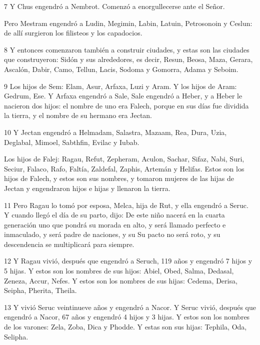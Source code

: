 \par 7 Y Chus engendró a Nembrot. Comenzó a enorgullecerse ante el Señor.

\par Pero Mestram engendró a Ludin, Megimin, Labin, Latuin, Petrosonoin y Ceslun: de allí surgieron los filisteos y los capadocios.

\par 8 Y entonces comenzaron también a construir ciudades, y estas son las ciudades que construyeron: Sidón y sus alrededores, es decir, Resun, Beosa, Maza, Gerara, Ascalón, Dabir, Camo, Tellun, Lacis, Sodoma y Gomorra, Adama y Seboim.

\par 9 Los hijos de Sem: Elam, Asur, Arfaxa, Luzi y Aram. Y los hijos de Aram: Gedrum, Ese. Y Arfaxa engendró a Sale, Sale engendró a Heber, y a Heber le nacieron dos hijos: el nombre de uno era Falech, porque en sus días fue dividida la tierra, y el nombre de su hermano era Jectan.

\par 10 Y Jectan engendró a Helmadam, Salastra, Mazaam, Rea, Dura, Uzia, Deglabal, Mimoel, Sabthfin, Evilac y Iubab.

\par Los hijos de Falej: Ragau, Refut, Zepheram, Aculon, Sachar, Sifaz, Nabi, Suri, Seciur, Falaco, Rafo, Faltía, Zaldefal, Zaphis, Artemán y Helifas. Estos son los hijos de Falech, y estos son sus nombres, y tomaron mujeres de las hijas de Jectan y engendraron hijos e hijas y llenaron la tierra.

\par 11 Pero Ragau lo tomó por esposa, Melca, hija de Rut, y ella engendró a Seruc. Y cuando llegó el día de su parto, dijo: De este niño nacerá en la cuarta generación uno que pondrá su morada en alto, y será llamado perfecto e inmaculado, y será padre de naciones, y su Su pacto no será roto, y su descendencia se multiplicará para siempre.

\par 12 Y Ragau vivió, después que engendró a Seruch, 119 años y engendró 7 hijos y 5 hijas. Y estos son los nombres de sus hijos: Abiel, Obed, Salma, Dedasal, Zeneza, Accur, Nefes. Y estos son los nombres de sus hijas: Cedema, Derisa, Seipha, Pherita, Theila.

\par 13 Y vivió Seruc veintinueve años y engendró a Nacor. Y Seruc vivió, después que engendró a Nacor, 67 años y engendró 4 hijos y 3 hijas. Y estos son los nombres de los varones: Zela, Zoba, Dica y Phodde. Y estas son sus hijas: Tephila, Oda, Selipha.

